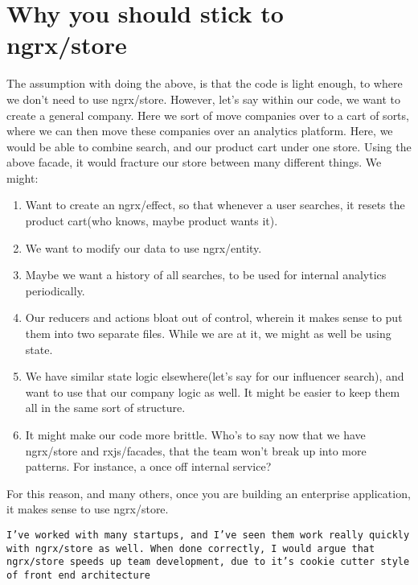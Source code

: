 \section{Why you should stick to ngrx/store}
The assumption with doing the above, is that the code is light enough, to where we don't need to use ngrx/store. However, let's say within our code, we want to create a general company. Here we sort of move companies over to a cart of sorts, where we can then move these companies over an analytics platform. Here, we would be able to combine search, and our product cart under one store. Using the above facade, it would fracture our store between many different things. We might: 
\begin{enumerate}
  \item Want to create an ngrx/effect, so that whenever a user searches, it resets the product cart(who knows, maybe product wants it).
  \item We want to modify our data to use ngrx/entity. 
  \item Maybe we want a history of all searches, to be used for internal analytics periodically. 
  \item Our reducers and actions bloat out of control, wherein it makes sense to put them into two separate files. While we are at it, we might as well be using state. 
  \item We have similar state logic elsewhere(let's say for our influencer search), and want to use that our company logic as well. It might be easier to keep them all in the same sort of structure.
  \item It might make our code more brittle. Who's to say now that we have ngrx/store and rxjs/facades, that the team won't break up into more patterns. For instance, a once off internal service? 
\end{enumerate}

For this reason, and many others, once you are building an enterprise application, it makes sense to use ngrx/store. 

\texttt{I've worked with many startups, and I've seen them work really quickly with ngrx/store as well. When done correctly, I would argue that ngrx/store speeds up team development, due to it's cookie cutter style of front end architecture}

